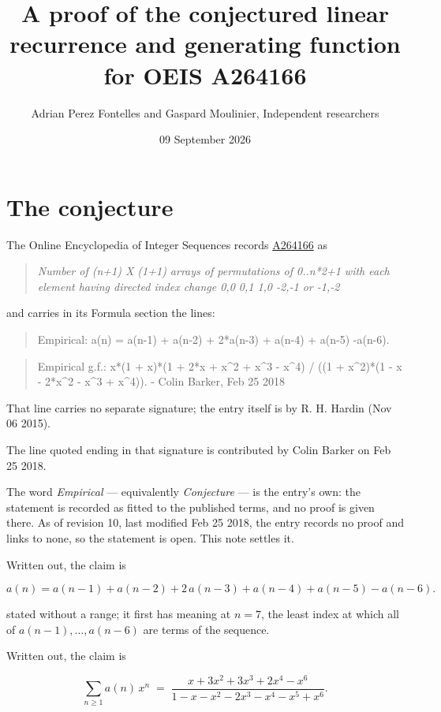 \documentclass[11pt]{article}
\title{A proof of the conjectured linear recurrence and generating function for OEIS A264166}
\author{Adrian Perez Fontelles and Gaspard Moulinier, Independent researchers}
\date{09 September 2026}
\theoremstyle{definition}
\begin{document}
\maketitle
\section{The conjecture}

The Online Encyclopedia of Integer Sequences records \href{https://oeis.org/A264166}{A264166} as

\begin{quote}\itshape Number of (n+1) X (1+1) arrays of permutations of 0..n*2+1 with each element having directed index change 0,0 0,1 1,0 -2,-1 or -1,-2\end{quote}

and carries in its Formula section the lines:

\begin{quote}\ttfamily Empirical: a(n) = a(n-1) + a(n-2) + 2*a(n-3) + a(n-4) + a(n-5) -a(n-6).\end{quote}

\begin{quote}\ttfamily Empirical g.f.: x*(1 + x)*(1 + 2*x + x\textasciicircum{}2 + x\textasciicircum{}3 - x\textasciicircum{}4) / ((1 + x\textasciicircum{}2)*(1 - x - 2*x\textasciicircum{}2 - x\textasciicircum{}3 + x\textasciicircum{}4)). - Colin Barker, Feb 25 2018\end{quote}

That line carries no separate signature; the entry itself is by R. H. Hardin (Nov 06 2015).

The line quoted ending in that signature is contributed by Colin Barker on Feb 25 2018.

The word {\itshape Empirical} --- equivalently {\itshape Conjecture} --- is the entry's own: the statement is recorded as fitted to the published terms, and no proof is given there. As of revision 10, last modified Feb 25 2018, the entry records no proof and links to none, so the statement is open. This note settles it.

Written out, the claim is

\[a(n) = a(n-1) + a(n-2) + 2\,a(n-3) + a(n-4) + a(n-5) - a(n-6).\]

stated without a range; it first has meaning at $n = 7$, the least index at which all of $a(n-1),\dots,a(n-6)$ are terms of the sequence.

Written out, the claim is

\[\sum_{n \ge 1} a(n)\,x^n \;=\; \frac{x + 3x^{2} + 3x^{3} + 2x^{4} - x^{6}}{1 - x - x^{2} - 2x^{3} - x^{4} - x^{5} + x^{6}}.\]
\end{document}

